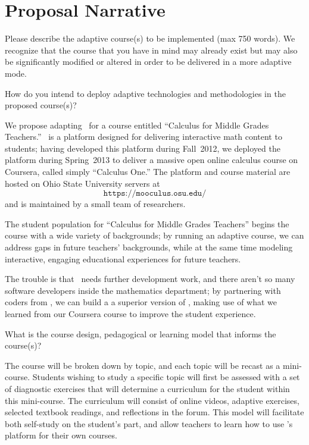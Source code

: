 \section*{Proposal Narrative}


\begin{question}
Please describe the adaptive course(s) to be implemented (max 750
words). We recognize that the course that you have in mind may
already exist but may also be significantly modified or altered in
order to be delivered in a more adaptive mode.
\end{question}

\begin{subquestion} 
How do you intend to deploy adaptive technologies and methodologies in
the proposed course(s)?
\end{subquestion}

We propose adapting \mooculus\ for a course entitled ``Calculus for
Middle Grades Teachers.''  \mooculus\ is a platform designed for
delivering interactive math content to students; having developed this
platform during Fall~2012, we deployed the platform during Spring~2013
to deliver a massive open online calculus course on Coursera, called
simply ``Calculus One.''  The platform and course material are hosted
on Ohio State University servers at 
\[
\texttt{https://mooculus.osu.edu/}
\]
and is maintained by a small team of researchers.

The student population for ``Calculus for Middle Grades Teachers''
begins the course with a wide variety of backgrounds; by running an
adaptive course, we can address gaps in future teachers' backgrounds,
while at the same time modeling interactive, engaging educational
experiences for future teachers.

The trouble is that \mooculus\ needs further development work, and
there aren't so many software developers inside the mathematics
department; by partnering with coders from \gratisu, we can build a a
superior version of \mooculus, making use of what we learned from our
Coursera course to improve the student experience.

\begin{subquestion}
 What is the course design, pedagogical or learning model that informs
 the course(s)?
\end{subquestion}

The course will be broken down by topic, and each topic will be recast
as a mini-course.  Students wishing to study a specific topic will
first be assessed with a set of diagnostic exercises that will
determine a curriculum for the student within this mini-course.  The
curriculum will consist of online videos, adaptive exercises, selected
textbook readings, and reflections in the forum.  This model will
facilitate both self-study on the student's part, and allow teachers
to learn how to use \gratisu's platform for their own courses.

